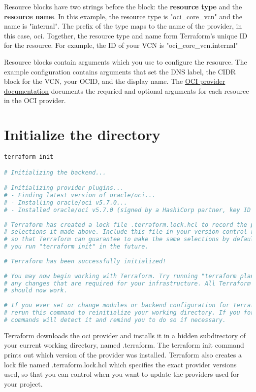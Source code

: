 \documentclass[../main.tex]{subfiles}
\begin{document}
Resource blocks have two strings before the block: the \textbf{resource type} and the \textbf{resource name}.
In this example, the resource type is "oci\_core\_vcn" and the name is "internal".
The prefix of the type maps to the name of the provider, in this case, oci. 
Together, the resource type and name form Terraform's unique ID for the resource. For example, the ID of your \gls{VCN} is "oci\_core\_vcn.internal"

Resource blocks contain arguments which you use to configure the resource. The example configuration contains arguments that set the \gls{DNS} label, the \gls{CIDR} block for the \gls{VCN}, your \gls{OCID}, and the display name.
The \href{https://registry.terraform.io/providers/oracle/oci/latest}{OCI provider documentation} documents the requried and optional arguments for each resource in the \gls{OCI} provider.

\section{Initialize the directory}
\begin{lstlisting}[language=bash]
terraform init

# Initializing the backend...

# Initializing provider plugins...
# - Finding latest version of oracle/oci...
# - Installing oracle/oci v5.7.0...
# - Installed oracle/oci v5.7.0 (signed by a HashiCorp partner, key ID 1533A49284137CEB)
 
# Terraform has created a lock file .terraform.lock.hcl to record the provider
# selections it made above. Include this file in your version control repository
# so that Terraform can guarantee to make the same selections by default when
# you run "terraform init" in the future.
 
# Terraform has been successfully initialized!
 
# You may now begin working with Terraform. Try running "terraform plan" to see
# any changes that are required for your infrastructure. All Terraform commands
# should now work.
 
# If you ever set or change modules or backend configuration for Terraform,
# rerun this command to reinitialize your working directory. If you forget, other
# commands will detect it and remind you to do so if necessary.
\end{lstlisting}
Terraform downloads the oci provider and installs it in a hidden subdirectory of your current working directory, named .terraform. The terraform init command prints out which version of the provider was installed. Terraform also creates a lock file named .terraform.lock.hcl which specifies the exact provider versions used, so that you can control when you want to update the providers used for your project.



\printglossaries
\end{document}
